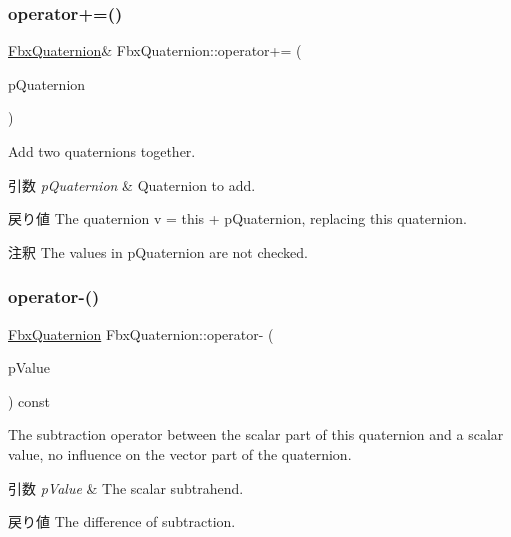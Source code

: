 \subsubsection{\texorpdfstring{operator+=()}{operator+=()}\hspace{0.1cm}{\footnotesize\ttfamily [2/2]}}
{\footnotesize\ttfamily \hyperlink{class_fbx_quaternion}{Fbx\+Quaternion}\& Fbx\+Quaternion\+::operator+= (\begin{DoxyParamCaption}\item[{const \hyperlink{class_fbx_quaternion}{Fbx\+Quaternion} \&}]{p\+Quaternion }\end{DoxyParamCaption})}

Add two quaternions together. 
\begin{DoxyParams}{引数}
{\em p\+Quaternion} & Quaternion to add. \\
\hline
\end{DoxyParams}
\begin{DoxyReturn}{戻り値}
The quaternion v\textquotesingle{} = this + p\+Quaternion, replacing this quaternion. 
\end{DoxyReturn}
\begin{DoxyRemark}{注釈}
The values in p\+Quaternion are not checked. 
\end{DoxyRemark}
\mbox{\label{class_fbx_quaternion_a1a9ef15dc33423fb804ea30420297328}} 
\subsubsection{\texorpdfstring{operator-\/()}{operator-()}\hspace{0.1cm}{\footnotesize\ttfamily [1/3]}}
{\footnotesize\ttfamily \hyperlink{class_fbx_quaternion}{Fbx\+Quaternion} Fbx\+Quaternion\+::operator-\/ (\begin{DoxyParamCaption}\item[{double}]{p\+Value }\end{DoxyParamCaption}) const}

The subtraction operator between the scalar part of this quaternion and a scalar value, no influence on the vector part of the quaternion. 
\begin{DoxyParams}{引数}
{\em p\+Value} & The scalar subtrahend. \\
\hline
\end{DoxyParams}
\begin{DoxyReturn}{戻り値}
The difference of subtraction. 
\end{DoxyReturn}
\mbox{\label{class_fbx_quaternion_ab6c1bcdc81e7f898a10efbe01fc469d9}} 
